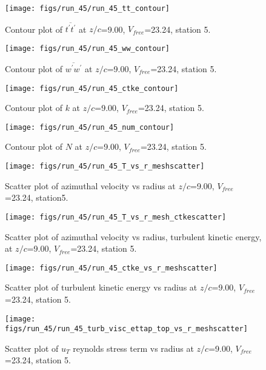 \begin{figure}[H]
\centering
\texttt{[image: figs/run\_45/run\_45\_tt\_contour]}
\caption{Contour plot of $\overline{t^\prime t^\prime}$ at $z/c$=9.00, $V_{free}$=23.24, station 5.}
\end{figure}


\begin{figure}[H]
\centering
\texttt{[image: figs/run\_45/run\_45\_ww\_contour]}
\caption{Contour plot of $\overline{w^\prime w^\prime}$ at $z/c$=9.00, $V_{free}$=23.24, station 5.}
\end{figure}


\begin{figure}[H]
\centering
\texttt{[image: figs/run\_45/run\_45\_ctke\_contour]}
\caption{Contour plot of $k$ at $z/c$=9.00, $V_{free}$=23.24, station 5.}
\end{figure}


\begin{figure}[H]
\centering
\texttt{[image: figs/run\_45/run\_45\_num\_contour]}
\caption{Contour plot of $N$ at $z/c$=9.00, $V_{free}$=23.24, station 5.}
\end{figure}


\begin{figure}[H]
\centering
\texttt{[image: figs/run\_45/run\_45\_T\_vs\_r\_meshscatter]}
\caption{Scatter plot of azimuthal velocity vs radius at $z/c$=9.00, $V_{free}$=23.24, station5.}
\end{figure}


\begin{figure}[H]
\centering
\texttt{[image: figs/run\_45/run\_45\_T\_vs\_r\_mesh\_ctkescatter]}
\caption{Scatter plot of azimuthal velocity vs radius, turbulent kinetic energy, at $z/c$=9.00, $V_{free}$=23.24, station 5.}
\end{figure}


\begin{figure}[H]
\centering
\texttt{[image: figs/run\_45/run\_45\_ctke\_vs\_r\_meshscatter]}
\caption{Scatter plot of turbulent kinetic energy vs radius at $z/c$=9.00, $V_{free}$=23.24, station 5.}
\end{figure}


\begin{figure}[H]
\centering
\texttt{[image: figs/run\_45/run\_45\_turb\_visc\_ettap\_top\_vs\_r\_meshscatter]}
\caption{Scatter plot of $
u_T$ reynolds stress term vs radius at $z/c$=9.00, $V_{free}$=23.24, station 5.}
\end{figure}


